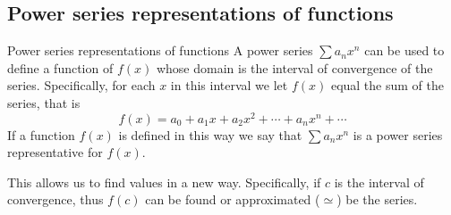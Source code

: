 \documentclass[newPxFont]{beamer}
\begin{document}
\subsection{Power series representations of functions}
\begin{frame}{Power series representations of functions}
  A \alert{power series} $\sum a_nx^n$ can be used to define a function of $f(x)$ whose domain is the interval of convergence of the series. Specifically, for each $x$ in this interval we let $f(x)$ equal the sum of the series, that is
  \begin{equation}
    f(x)=a_0+a_1x+a_2x^2+\cdots+a_nx^n+\cdots
  \end{equation}
If a function $f(x)$ is defined in this way we say that $\sum a_nx^n$ is \alert{a power series representative for $f(x)$}.

\alert{This allows us to find values in a new way}. Specifically, if $c$ is the interval of convergence, thus $f(c)$ can be found  or approximated ($\simeq$) be the series.
\end{frame}
\end{document}
